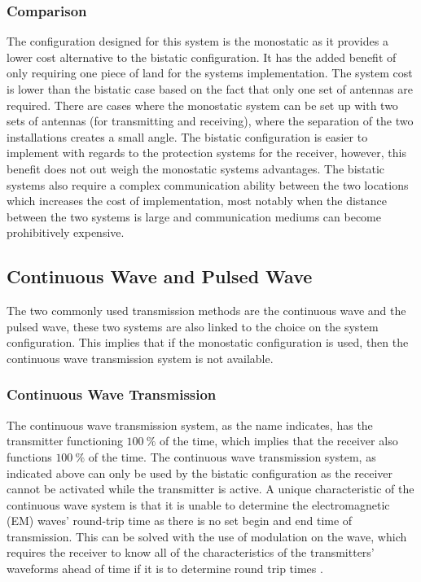 \documentclass[11pt]{witseiepaper}
\begin{document}
\begin{bibunit}[witseie]
\subsubsection{Comparison} \label{sec:Comparison}
The configuration designed for this system is the monostatic as it provides a lower cost alternative to the bistatic configuration. It has the added benefit of only requiring one piece of land for the systems implementation. The system cost is lower than the bistatic case based on the fact that only one set of antennas are required. There are cases where the monostatic system can be set up with two sets of antennas (for transmitting and receiving), where the separation of the two installations creates a small angle.
The bistatic configuration is easier to implement with regards to the protection systems for the receiver, however, this benefit does not out weigh the monostatic systems advantages. The bistatic systems also require a complex communication ability between the two locations which increases the cost of implementation, most notably when the distance between the two systems is large and communication mediums can become prohibitively expensive.

\subsection{Continuous Wave and Pulsed Wave} \label{sec:ContinuousWaveandPulsedWave}

The two commonly used transmission methods are the continuous wave and the pulsed wave, these two systems are also linked to the choice on the system configuration.
This implies that if the monostatic configuration is used, then the continuous wave transmission system is not available.

\subsubsection{Continuous Wave Transmission} \label{sec:ContinuousWaveTransmission}

The continuous wave transmission system, as the name indicates, has the transmitter functioning $100~\%$ of the time, which implies that the receiver also functions $100~\%$ of the time. The continuous wave transmission system, as indicated above can only be used by the bistatic configuration as the receiver cannot be activated while the transmitter is active.
A unique characteristic of the continuous wave system is that it is unable to determine the electromagnetic (EM) waves' round-trip time as there is no set begin and end time of transmission. This can be solved with the use of modulation on the wave, which requires the receiver to know all of the characteristics of the transmitters' waveforms ahead of time if it is to determine round trip times \cite[p.~20]{radarHandbook}.


\end{bibunit}
\end{document}
